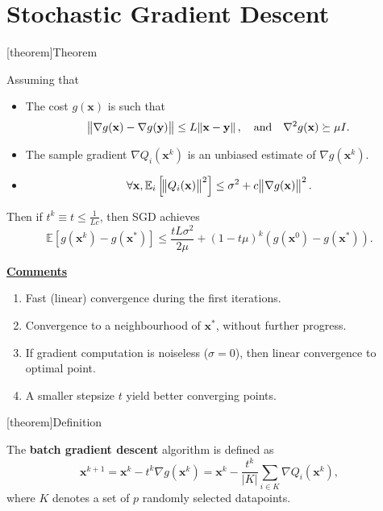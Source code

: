 \documentclass[12pt]{report}
\theoremstyle{definition}
\begin{document}
\section{Stochastic Gradient Descent}

[theorem]{Theorem}
\begin{convergence of SGD}
    Assuming that
    \begin{itemize}
        \item The cost $g(\mathbf{x})$ is such that
            \[
                \norm{\nabla g(\mathbf{x})-\nabla g(\mathbf{y})}\le
                L\norm{\mathbf{x}-\mathbf{y}},\quad
                \text{and}\quad
                \nabla^2g(\mathbf{x})\succeq\mu I.
            \]
        \item The sample gradient $\nabla Q_i(\mathbf{x}^k)$ is an unbiased
            estimate of $\nabla g(\mathbf{x}^k)$.
        \item \[
                \forall \mathbf{x},
                \mathbb{E}_i\left[\norm{Q_i(\mathbf{x})}^2\right]\le
                \sigma^2+c\norm{\nabla g(\mathbf{x})}^2.
        \]
    \end{itemize} 
    Then if $t^k\equiv t\le \frac{1}{Lc}$, then SGD achieves
    \[
        \mathbb{E}\left[g(\mathbf{x}^k)-g(\mathbf{x}^*)\right]
        \le\frac{tL\sigma^2}{2\mu}+{(1-t\mu)}^{k}(g(\mathbf{x}^0)-g(\mathbf{x}^*)).
    \]
\end{convergence of SGD}
\underline{\textbf{Comments}}
\begin{enumerate}
    \item Fast (linear) convergence during the first iterations.
    \item Convergence to a neighbourhood of $\mathbf{x}^*$, without further
        progress.
    \item If gradient computation is noiseless ($\sigma=0$), then linear
        convergence to optimal point.
    \item A smaller stepsize $t$ yield better converging points.
\end{enumerate} 

[theorem]{Definition}
\begin{batch gradient descent}
    The \textbf{batch gradient descent} algorithm is defined as
    \[
        \mathbf{x}^{k+1}=\mathbf{x}^k-t^k\nabla g(\mathbf{x}^k)
        =\mathbf{x}^k-\frac{t^k}{|K|}\sum_{i\in K}\nabla Q_i(\mathbf{x}^k),
    \]
    where $K$ denotes a set of $p$ randomly selected datapoints.
\end{batch gradient descent}
\end{document}
